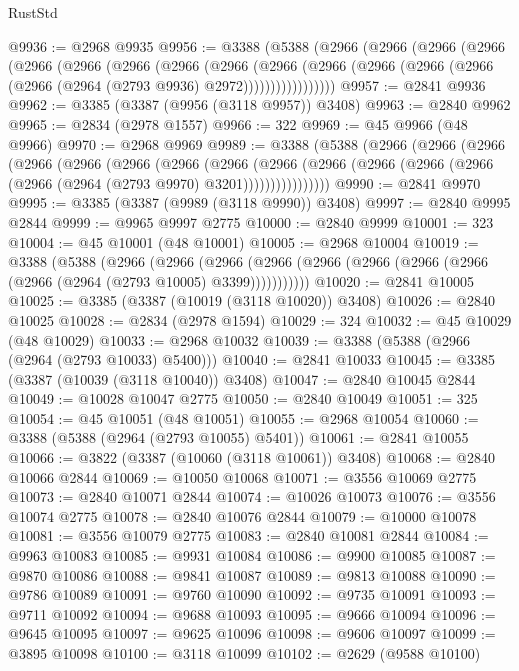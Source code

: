 \begin{lexlean}{RustStd}
\begin{coremodule}
@9936 := @2968 @9935
@9956 := @3388
    (@5388
      (@2966
        (@2966
          (@2966
            (@2966
              (@2966
                (@2966
                  (@2966
                    (@2966
                      (@2966
                        (@2966
                          (@2966
                            (@2966 (@2966 (@2966 (@2966 (@2964 (@2793 @9936) @2972)))))))))))))))))
@9957 := @2841 @9936
@9962 := @3385 (@3387 (@9956 (@3118 @9957)) @3408)
@9963 := @2840 @9962
@9965 := @2834 (@2978 @1557)
@9966 := 322
@9969 := @45 @9966 (@48 @9966)
@9970 := @2968 @9969
@9989 := @3388
    (@5388
      (@2966
        (@2966
          (@2966
            (@2966
              (@2966
                (@2966
                  (@2966
                    (@2966
                      (@2966
                        (@2966
                          (@2966 (@2966 (@2966 (@2966 (@2964 (@2793 @9970) @3201))))))))))))))))
@9990 := @2841 @9970
@9995 := @3385 (@3387 (@9989 (@3118 @9990)) @3408)
@9997 := @2840 @9995 @2844
@9999 := @9965 @9997 @2775
@10000 := @2840 @9999
@10001 := 323
@10004 := @45 @10001 (@48 @10001)
@10005 := @2968 @10004
@10019 := @3388
    (@5388
      (@2966
        (@2966
          (@2966 (@2966 (@2966 (@2966 (@2966 (@2966 (@2966 (@2964 (@2793 @10005) @3399)))))))))))
@10020 := @2841 @10005
@10025 := @3385 (@3387 (@10019 (@3118 @10020)) @3408)
@10026 := @2840 @10025
@10028 := @2834 (@2978 @1594)
@10029 := 324
@10032 := @45 @10029 (@48 @10029)
@10033 := @2968 @10032
@10039 := @3388 (@5388 (@2966 (@2964 (@2793 @10033) @5400)))
@10040 := @2841 @10033
@10045 := @3385 (@3387 (@10039 (@3118 @10040)) @3408)
@10047 := @2840 @10045 @2844
@10049 := @10028 @10047 @2775
@10050 := @2840 @10049
@10051 := 325
@10054 := @45 @10051 (@48 @10051)
@10055 := @2968 @10054
@10060 := @3388 (@5388 (@2964 (@2793 @10055) @5401))
@10061 := @2841 @10055
@10066 := @3822 (@3387 (@10060 (@3118 @10061)) @3408)
@10068 := @2840 @10066 @2844
@10069 := @10050 @10068
@10071 := @3556 @10069 @2775
@10073 := @2840 @10071 @2844
@10074 := @10026 @10073
@10076 := @3556 @10074 @2775
@10078 := @2840 @10076 @2844
@10079 := @10000 @10078
@10081 := @3556 @10079 @2775
@10083 := @2840 @10081 @2844
@10084 := @9963 @10083
@10085 := @9931 @10084
@10086 := @9900 @10085
@10087 := @9870 @10086
@10088 := @9841 @10087
@10089 := @9813 @10088
@10090 := @9786 @10089
@10091 := @9760 @10090
@10092 := @9735 @10091
@10093 := @9711 @10092
@10094 := @9688 @10093
@10095 := @9666 @10094
@10096 := @9645 @10095
@10097 := @9625 @10096
@10098 := @9606 @10097
@10099 := @3895 @10098
@10100 := @3118 @10099
@10102 := @2629 (@9588 @10100)

\end{coremodule}
\end{lexlean}
